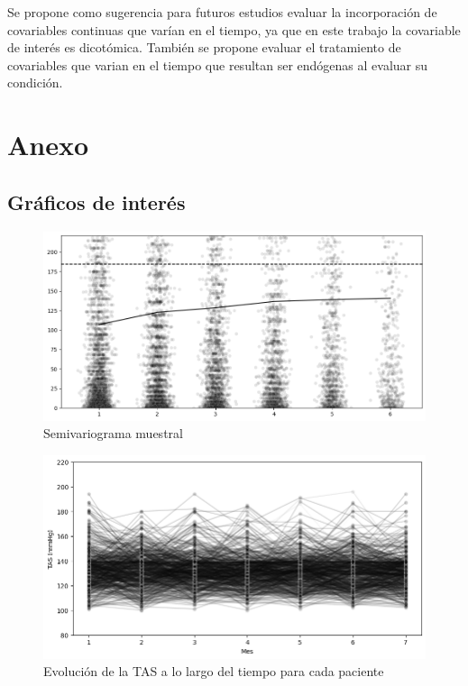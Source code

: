 \documentclass[spanish]{article}
\numberwithin{figure}{subsection}
\numberwithin{equation}{subsection}
\numberwithin{table}{subsection}
\begin{document}
Se propone como sugerencia para futuros estudios evaluar la incorporación de
covariables continuas que varían en el tiempo, ya que en este trabajo la
covariable de interés es dicotómica. También se propone evaluar el tratamiento
de covariables que varian en el tiempo que resultan ser endógenas al evaluar su
condición.

\newpage

\section{Anexo}

\subsection{Gráficos de interés}

\begin{figure}[H]
	\centering
	\includegraphics[scale=0.4]{img/semivariogram.png}
	\caption{Semivariograma muestral}
	\label{semivariogram}
\end{figure}

\begin{figure}[H]
	\centering
	\includegraphics[scale=0.5]{img/TAS_vs_tpo_perfiles_individuales.png}
	\caption{Evolución de la TAS a lo largo del tiempo para cada paciente}
	\label{perfiles_individuales}
\end{figure}
\end{document}
